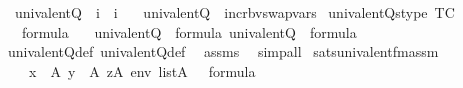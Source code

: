 \begin{isabellebody}
\isanewline
{}\isamarkupfalse%
\isanewline
\ \ univalent{\isacharunderscore}{\kern0pt}Q{}\ {\isacharcolon}{\kern0pt}{\isacharcolon}{\kern0pt}\ {\isachardoublequoteopen}i\ {\isasymRightarrow}\ i{\isachardoublequoteclose}\ \isanewline
\ \ {\isachardoublequoteopen}univalent{\isacharunderscore}{\kern0pt}Q{}{\isacharparenleft}{\kern0pt}{\isasymphi}{\isacharparenright}{\kern0pt}\ {\isasymequiv}\ incr{\isacharunderscore}{\kern0pt}bv{\isacharparenleft}{\kern0pt}swap{\isacharunderscore}{\kern0pt}vars{\isacharparenleft}{\kern0pt}{\isasymphi}{\isacharparenright}{\kern0pt}{\isacharparenright}{\kern0pt}{\isacharbackquote}{\kern0pt}{}{\isachardoublequoteclose}\isanewline
\isanewline
{}\isamarkupfalse%
\ univalent{\isacharunderscore}{\kern0pt}Qs{\isacharunderscore}{\kern0pt}type\ {\isacharbrackleft}{\kern0pt}TC{\isacharbrackright}{\kern0pt}{\isacharcolon}{\kern0pt}\ \isanewline
\ \ \ {\isachardoublequoteopen}{\isasymphi}{\isasymin}formula{\isachardoublequoteclose}\isanewline
\ \ \ {\isachardoublequoteopen}univalent{\isacharunderscore}{\kern0pt}Q{}{\isacharparenleft}{\kern0pt}{\isasymphi}{\isacharparenright}{\kern0pt}\ {\isasymin}\ formula{\isachardoublequoteclose}\ {\isachardoublequoteopen}univalent{\isacharunderscore}{\kern0pt}Q{}{\isacharparenleft}{\kern0pt}{\isasymphi}{\isacharparenright}{\kern0pt}\ {\isasymin}\ formula{\isachardoublequoteclose}\isanewline
%
\isadelimproof
\ \ %
\endisadelimproof
%
\isatagproof
{}\isamarkupfalse%
\ univalent{\isacharunderscore}{\kern0pt}Q{}{\isacharunderscore}{\kern0pt}def\ univalent{\isacharunderscore}{\kern0pt}Q{}{\isacharunderscore}{\kern0pt}def\ \isamarkupfalse%
\ assms\ \isamarkupfalse%
\ simp{\isacharunderscore}{\kern0pt}all%
\endisatagproof
{\isafoldproof}%
%
\isadelimproof
\isanewline
%
\endisadelimproof
\isanewline
{}\isamarkupfalse%
\ sats{\isacharunderscore}{\kern0pt}univalent{\isacharunderscore}{\kern0pt}fm{\isacharunderscore}{\kern0pt}assm{\isacharcolon}{\kern0pt}\isanewline
\ \ \ \isanewline
\ \ \ \ {\isachardoublequoteopen}x\ {\isasymin}\ A{\isachardoublequoteclose}\ {\isachardoublequoteopen}y\ {\isasymin}\ A{\isachardoublequoteclose}\ {\isachardoublequoteopen}z{\isasymin}A{\isachardoublequoteclose}\ {\isachardoublequoteopen}env{\isasymin}\ list{\isacharparenleft}{\kern0pt}A{\isacharparenright}{\kern0pt}{\isachardoublequoteclose}\ {\isachardoublequoteopen}{\isasymphi}\ {\isasymin}\ formula{\isachardoublequoteclose}\isanewline

\end{isabellebody}
